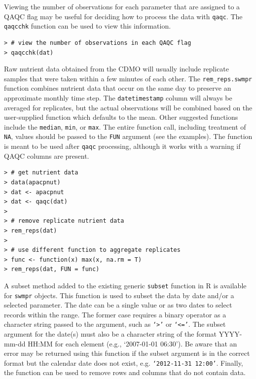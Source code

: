 \documentclass[10pt,letterpaper]{article}\usepackage[]{graphicx}\usepackage[]{color}
\makeatletter
\newenvironment{kframe}{%
 \def\at@end@of@kframe{}%
 \ifinner\ifhmode%
  \def\at@end@of@kframe{\end{minipage}}%
  \begin{minipage}{\columnwidth}%
 \fi\fi%
 \def\FrameCommand##1{\hskip\@totalleftmargin \hskip-\fboxsep
 \colorbox{shadecolor}{##1}\hskip-\fboxsep
     \hskip-\linewidth \hskip-\@totalleftmargin \hskip\columnwidth}%
 \MakeFramed {\advance\hsize-\width
   \@totalleftmargin\z@ \linewidth\hsize
   \@setminipage}}%
 {\par\unskip\endMakeFramed%
 \at@end@of@kframe}
\newenvironment{knitrout}{}{} %
\makeatother
\begin{document}
Viewing the number of observations for each parameter that are assigned to a \ac{QAQC} flag may be useful for deciding how to process the data with \texttt{qaqc}.  The \texttt{qaqcchk} function can be used to view this information.

\begin{knitrout}\small
{}\color{fgcolor}\begin{kframe}
\begin{verbatim}
> # view the number of observations in each QAQC flag
> qaqcchk(dat)
\end{verbatim}
\end{kframe}
\end{knitrout}

Raw nutrient data obtained from the \ac{CDMO} will usually include replicate samples that were taken within a few minutes of each other.  The \texttt{rem\_reps.swmpr} function combines nutrient data that occur on the same day to preserve an approximate monthly time step.  The \texttt{datetimestamp} column will always be averaged for replicates, but the actual observations will be combined based on the user-supplied function which defaults to the mean.  Other suggested functions include the \texttt{median}, \texttt{min}, or \texttt{max}.  The entire function call, including treatment of \texttt{NA}, values should be passed to the \texttt{FUN} argument (see the examples).  The function is meant to be used after \texttt{qaqc} processing, although it works with a warning if \ac{QAQC} columns are present.

\begin{knitrout}\small
{}\color{fgcolor}\begin{kframe}
\begin{verbatim}
> # get nutrient data
> data(apacpnut)
> dat <- apacpnut
> dat <- qaqc(dat)
> 
> # remove replicate nutrient data
> rem_reps(dat)
> 
> # use different function to aggregate replicates
> func <- function(x) max(x, na.rm = T)
> rem_reps(dat, FUN = func)
\end{verbatim}
\end{kframe}
\end{knitrout}

A subset method added to the existing generic \texttt{subset} function in R is available for \texttt{swmpr} objects.  This function is used to subset the data by date and/or a selected parameter.  The date can be a single value or as two dates to select records within the range. The former case requires a binary operator as a character string passed to the argument, such as \texttt{`>'} or \texttt{`<='}.  The subset argument for the date(s) must also be a character string of the format YYYY-mm-dd HH:MM for each element (e.g., `2007-01-01 06:30').  Be aware that an error may be returned using this function if the subset argument is in the correct format but the calendar date does not exist, e.g. \texttt{`2012-11-31 12:00'}.  Finally, the function can be used to remove rows and columns that do not contain data. 
\end{document}
